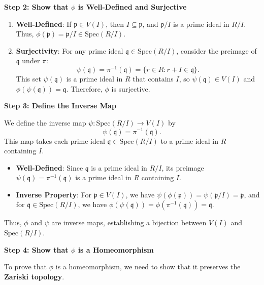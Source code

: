 \documentclass[11pt,openany]{article}
\begin{document}
\textbf{Step 2: Show that \( \phi \) is Well-Defined and Surjective}

\begin{enumerate}
	\item \textbf{Well-Defined}: If \( \mathfrak{p} \in V(I) \), then \( I \subseteq \mathfrak{p} \), and \( \mathfrak{p}/I \) is a prime ideal in \( R/I \). Thus, \( \phi(\mathfrak{p}) = \mathfrak{p}/I \in \text{Spec}(R/I) \).
	
	\item \textbf{Surjectivity}: For any prime ideal \( \mathfrak{q} \in \text{Spec}(R/I) \), consider the preimage of \( \mathfrak{q} \) under \( \pi \):
	\[
	\psi(\mathfrak{q}) = \pi^{-1}(\mathfrak{q}) = \{ r \in R : r + I \in \mathfrak{q} \}.
	\]
	This set \( \psi(\mathfrak{q}) \) is a prime ideal in \( R \) that contains \( I \), so \( \psi(\mathfrak{q}) \in V(I) \) and \( \phi(\psi(\mathfrak{q})) = \mathfrak{q} \). Therefore, \( \phi \) is surjective.
\end{enumerate}

\textbf{Step 3: Define the Inverse Map}

We define the inverse map \( \psi: \text{Spec}(R/I) \to V(I) \) by
\[
\psi(\mathfrak{q}) = \pi^{-1}(\mathfrak{q}).
\]
This map takes each prime ideal \( \mathfrak{q} \in \text{Spec}(R/I) \) to a prime ideal in \( R \) containing \( I \).

\begin{itemize}
	\item \textbf{Well-Defined}: Since \( \mathfrak{q} \) is a prime ideal in \( R/I \), its preimage \( \psi(\mathfrak{q}) = \pi^{-1}(\mathfrak{q}) \) is a prime ideal in \( R \) containing \( I \).
	\item \textbf{Inverse Property}: For \( \mathfrak{p} \in V(I) \), we have \( \psi(\phi(\mathfrak{p})) = \psi(\mathfrak{p}/I) = \mathfrak{p} \), and for \( \mathfrak{q} \in \text{Spec}(R/I) \), we have \( \phi(\psi(\mathfrak{q})) = \phi(\pi^{-1}(\mathfrak{q})) = \mathfrak{q} \).
\end{itemize}

Thus, \( \phi \) and \( \psi \) are inverse maps, establishing a bijection between \( V(I) \) and \( \text{Spec}(R/I) \).

\textbf{Step 4: Show that \( \phi \) is a Homeomorphism}

To prove that \( \phi \) is a homeomorphism, we need to show that it preserves the \textbf{Zariski topology}.
\end{document}

